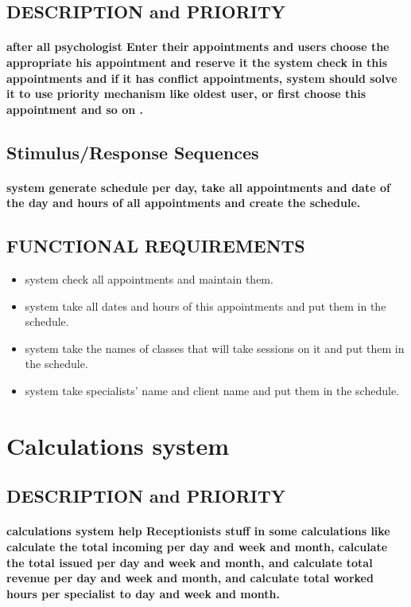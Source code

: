 \documentclass[../Psychological_system_web_application.tex]{subfiles}
\begin{document}
				\subsection{DESCRIPTION and PRIORITY}
					\paragraph{after all \gls{psychologist} Enter their appointments and users choose the appropriate his appointment and reserve it the system check in this appointments and if it has conflict appointments, system should solve it to use priority mechanism like oldest user, or first choose this appointment and so on .}
					
				\subsection{Stimulus/Response Sequences}
					\paragraph{system generate schedule per day, take all appointments and date of the day and hours of all appointments and create the schedule.}
					
				\subsection{FUNCTIONAL REQUIREMENTS}
					\begin{itemize}
						\item
							system check all appointments and maintain them.
						\item
							system take all dates and hours of this appointments and put them in the schedule.
						\item
							system take the names of classes that will take sessions on it and put them in the schedule.
						\item
							system take specialists' name and client name and put them in the schedule. 
					\end{itemize}
					
					
				\section{Calculations system}
				\subsection{DESCRIPTION and PRIORITY}
					\paragraph{calculations system help \gls{Receptionists} stuff in some calculations like calculate the total incoming per day and week and month, calculate the total issued per day and week and month, and calculate total revenue per day and week and month, and calculate total worked hours per specialist to day and week and month.}
					
\end{document}
